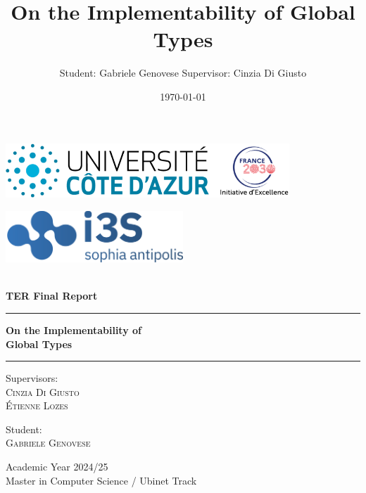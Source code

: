 \documentclass{article}
\title{On the Implementability of Global Types}
\author{Student: Gabriele Genovese Supervisor: Cinzia Di Giusto}
\date{\today}
\theoremstyle{definition}
\theoremstyle{definition}
\theoremstyle{definition}
\begin{document}
\begin{titlepage}
	\begin{center}
        \vspace{20mm}
        \begin{minipage}[t]{0.48\textwidth}
            \includegraphics[width=0.8\textwidth]{pres/unica.png}
        \end{minipage}%
        \hfill
        \begin{minipage}[t]{0.52\textwidth}\raggedleft
            \includegraphics[width=0.5\textwidth]{pres/i3s.png}
        \end{minipage}
        \\
        \vspace{35mm}
		{
        {\huge{\textbf{TER Final Report}}}
        }
	\end{center}
	\vspace{10mm}
	\begin{center}
        \par\noindent\rule{\textwidth}{0.8pt}
        \vspace{5mm}
		{\LARGE{\textbf{On the Implementability of\\Global Types}}}%
        \par\noindent\rule{\textwidth}{0.8pt}
        \vspace{5mm}
	\end{center}
	\vspace{30mm}
	\par
	\noindent
	\begin{minipage}[t]{0.47\textwidth}
		{\Large{Supervisors:\\
				\textsc{Cinzia Di Giusto}\\
				\textsc{Étienne Lozes}}}\\
	\end{minipage}
	\hfill
	\begin{minipage}[t]{0.47\textwidth}\raggedleft
		{\Large{Student:\\
				\textsc{Gabriele Genovese}\\
	}}
    \end{minipage}
	\vspace{25mm}
	\begin{center}
		{\large{Academic Year 2024/25\\Master in Computer Science / Ubinet Track}}
	\end{center}
\end{titlepage}
\end{document}
